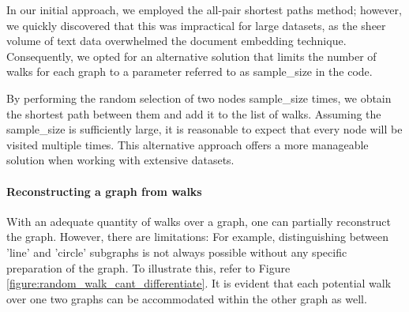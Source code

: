 In our initial approach, we employed the all-pair shortest paths method; however, we quickly discovered that this was impractical for large datasets, as the sheer volume of text data overwhelmed the document embedding technique. Consequently, we opted for an alternative solution that limits the number of walks for each graph to a parameter referred to as sample\_size in the code.

By performing the random selection of two nodes sample\_size times, we obtain the shortest path between them and add it to the list of walks. Assuming the sample\_size is sufficiently large, it is reasonable to expect that every node will be visited multiple times. This alternative approach offers a more manageable solution when working with extensive datasets.

\paragraph{Reconstructing a graph from walks}
With an adequate quantity of walks over a graph, one can partially reconstruct the graph. However, there are limitations: For example, distinguishing between 'line' and 'circle' subgraphs is not always possible without any specific preparation of the graph. To illustrate this, refer to Figure \ref{figure:random_walk_cant_differentiate}. It is evident that each potential walk over one two graphs can be accommodated within the other graph as well.

